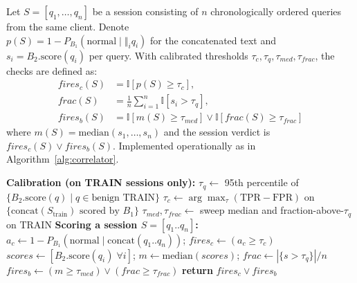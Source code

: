 \documentclass[conference]{IEEEtran}
\begin{document}
\vspace{4pt}
Let $S=[q_1, \dots, q_n]$ be a session consisting of $n$ chronologically ordered queries from the same client. Denote\\[2pt]
\mbox{$p(S)=1-P_{B_1}(\text{normal}\mid \Vert_{i} q_i)$} for the concatenated text and \mbox{$s_i=B_2.\text{score}(q_i)$} per query. With calibrated thresholds $\tau_c,\tau_q,\tau_{med},\tau_{frac}$, the checks are defined as:
\begingroup\small
\begin{equation}
\begin{aligned}
fires_c(S)&=\mathbb{I}[p(S)\geq \tau_c],\\
frac(S)&=\frac{1}{n}\sum_{i=1}^{n}\mathbb{I}[s_i>\tau_q],\\
fires_b(S)&=\mathbb{I}[m(S)\geq \tau_{med}] \lor \mathbb{I}[frac(S)\geq \tau_{frac}]
\end{aligned}
\end{equation}
\endgroup
where $m(S)=\mathrm{median}(s_1,\ldots,s_n)$ and the session verdict is\\[4pt]
\mbox{$fires_c(S) \lor fires_b(S)$}. Implemented operationally as in Algorithm~\ref{alg:correlator}.

\begin{algorithm}[htbp]
\footnotesize
\caption{SessionCorrelator: calibration and scoring (no gradient training)}
\label{alg:correlator}
\begin{algorithmic}[1]
\STATE \textbf{Calibration (on TRAIN sessions only):}
\STATE $\tau_q \leftarrow$ 95th percentile of
\STATE \hspace*{1em}$\{B_2.\text{score}(q) \mid q \in \text{benign TRAIN}\}$
\STATE $\tau_c \leftarrow \arg\max_{\tau} (\text{TPR}-\text{FPR})$ on
\STATE \hspace*{1em}$\{\text{concat}(S_{\text{train}}) \text{ scored by } B_1\}$
\STATE $\tau_{med}, \tau_{frac} \leftarrow$ sweep median and fraction-above-$\tau_q$
\STATE \hspace*{1em}on TRAIN
\STATE \textbf{Scoring a session $S=[q_1..q_n]$:}
\STATE $a_c \leftarrow 1-P_{B_1}(\text{normal} \mid \text{concat}(q_1..q_n))$; $fires_c \leftarrow (a_c \geq \tau_c)$
\STATE $scores \leftarrow [B_2.\text{score}(q_i) \; \forall i]$; $m \leftarrow \text{median}(scores)$; $frac \leftarrow |\{s>\tau_q\}|/n$
\STATE $fires_b \leftarrow (m \geq \tau_{med}) \lor (frac \geq \tau_{frac})$
\STATE \textbf{return} $fires_c \lor fires_b$ 
\end{algorithmic}
\end{algorithm}
\end{document}
